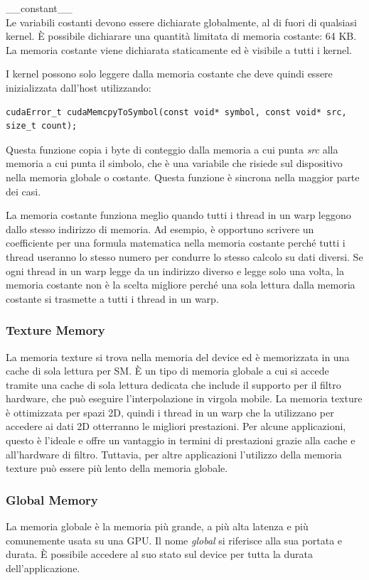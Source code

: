 \_\_constant\_\_ \\

Le variabili costanti devono essere dichiarate globalmente, al di fuori di qualsiasi kernel. È possibile dichiarare una quantità limitata di memoria costante: 64 KB. La memoria costante viene dichiarata staticamente ed è visibile a tutti i kernel.

I kernel possono solo leggere  dalla memoria costante che deve quindi essere inizializzata dall'host utilizzando:
\begin{lstlisting}[label=code:cudaMemcpyToSymbol_def]
cudaError_t cudaMemcpyToSymbol(const void* symbol, const void* src, size_t count);
\end{lstlisting}
Questa funzione copia i byte di conteggio dalla memoria a cui punta \emph{src} alla memoria a cui punta il simbolo, che è una variabile che risiede sul dispositivo nella memoria globale o costante. Questa funzione è sincrona nella maggior parte dei casi.

La memoria costante funziona meglio quando tutti i thread in un warp leggono dallo stesso indirizzo di memoria. Ad esempio, è opportuno scrivere un coefficiente per una formula matematica nella memoria costante perché tutti i thread useranno lo stesso numero per condurre lo stesso calcolo su dati diversi. Se ogni thread in un warp legge da un indirizzo diverso e legge solo una volta, la memoria costante non è la scelta migliore perché una sola lettura dalla memoria costante si trasmette a tutti i thread in un warp.

\subsubsection{Texture Memory}
La memoria texture si trova nella memoria del device ed è memorizzata in una cache di sola lettura per SM. È un tipo di memoria globale a cui si accede tramite una cache di sola lettura dedicata che include il supporto per il filtro hardware, che può eseguire l'interpolazione in virgola mobile. La memoria texture è ottimizzata per spazi 2D, quindi i thread in un warp che la utilizzano per accedere ai dati 2D otterranno le migliori prestazioni. Per alcune applicazioni, questo è l'ideale e offre un vantaggio in termini di prestazioni grazie alla cache e all'hardware di filtro. Tuttavia, per altre applicazioni l'utilizzo della memoria texture può essere più lento della memoria globale.

\subsubsection{Global Memory}
La memoria globale è la memoria più grande, a più alta latenza e più comunemente usata su una GPU. Il nome \emph{global} si riferisce alla sua portata e durata. È possibile accedere al suo stato sul device per tutta la durata dell'applicazione.

